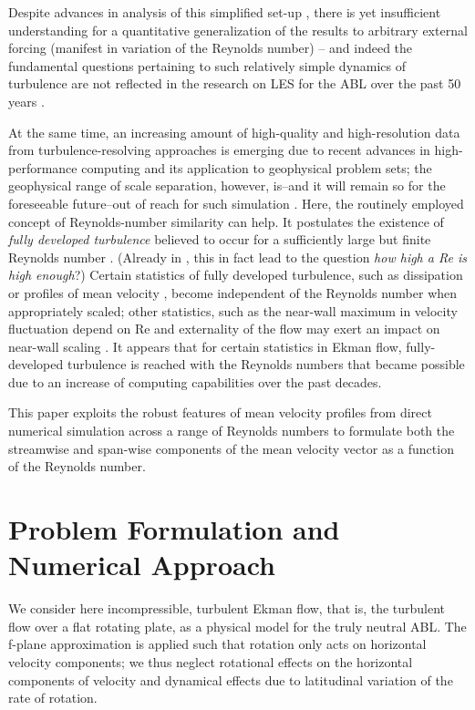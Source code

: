 \documentclass[smallcondensed,final]{svjour3}
\newcommand{\RE}{\mathrm{Re}}
\begin{document}
Despite advances in analysis of this simplified set-up \citep{jiang:JAS2018}, 
there is yet insufficient understanding for a quantitative generalization of the results to
arbitrary external forcing (manifest in variation of the Reynolds number) -- and indeed the fundamental
questions pertaining to such relatively simple dynamics of turbulence are not reflected in the
research on LES for the ABL over the past 50 years \citep{stoll:BM2020}. 
%
\par
% 
At the same time, an increasing amount of high-quality and high-resolution data from turbulence-resolving approaches
is emerging due to recent advances in high-performance computing and its application to geophysical problem sets;
the geophysical range of scale separation, however, is--and it will remain so for the foreseeable future--out of reach
for such simulation \citep{dimotakis:ARF2005}.
%
Here, the routinely employed concept of Reynolds-number similarity can help. It postulates the existence
of \emph{fully developed turbulence}  believed to occur for a sufficiently large but finite Reynolds number
\citep{barenblatt:PF1995}.
%
(Already in \citeyear{moin:ARF1998}, this in fact lead \citeauthor{moin:ARF1998} to the question \emph{how high a Re is high enough}?) 
%
Certain statistics of fully developed turbulence, such as dissipation \citep{dimotakis:ARF2005} or profiles of
mean velocity \citep{barenblatt:JFM1993}, become independent of the Reynolds number when appropriately scaled; 
other statistics, such as the near-wall maximum in velocity fluctuation depend on $\RE$ \citep{baars:JFM2020a} and externality
of the flow may exert an impact on near-wall scaling \citep{dasilva:ARF2014}. 
%
It appears that for certain statistics in Ekman flow, fully-developed turbulence is reached with the
Reynolds numbers that became possible due to an increase of computing capabilities over
the past decades.
%
\par
% 
This paper exploits the robust features of mean velocity profiles from direct numerical
simulation across a range of Reynolds numbers to formulate both the streamwise and span-wise components
of the mean velocity vector as a function of the Reynolds number.
%
\section{Problem Formulation and Numerical Approach}
%
We consider here incompressible, turbulent Ekman flow, that is, the turbulent flow over a flat rotating plate, as a physical model for the truly neutral ABL.
%
The f-plane approximation is applied such that rotation only acts on horizontal velocity components;
we thus neglect rotational effects on the horizontal components of velocity and dynamical effects
due to latitudinal variation of the rate of rotation.
%
\end{document}
